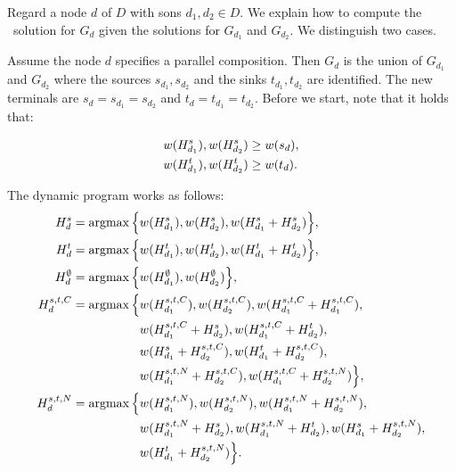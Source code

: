 Regard a node $d$ of $D$ with sons $d_1, d_2\in D$. We explain how to compute the \maxWSP\ solution for $G_d$ given the solutions for $G_{d_1}$ and $G_{d_2}$. We distinguish two cases.\medskip

Assume the node $d$ specifies a parallel composition. Then $G_d$ is the union of $G_{d_1}$ and $G_{d_2}$ where the sources $s_{d_1}, s_{d_2}$ and the sinks $t_{d_1}, t_{d_2}$ are identified. The new terminals are $s_d = s_{d_1} = s_{d_2}$ and $t_d = t_{d_1} = t_{d_2}$.
Before we start, note that it holds that:

\begin{align}
	\label{equ:spparallel}
	\begin{split}
		w(H_{d_1}^{s}), w(H_{d_2}^{s}) &\geq w(s_{d}),\\
		w(H_{d_1}^{t}), w(H_{d_2}^{t}) &\geq w(t_{d}).
	\end{split}
\end{align}

The dynamic program works as follows:
\begin{equation}
	\label{equ:parallelupdate}
	\begin{alignedat}{4}
		H_{d}^{s} &= \operatorname*{argmax} \Big\{ &&w(H_{d_1}^{s}), w(H_{d_2}^{s}), w(H_{d_1}^{s} + H_{d_2}^{s}) \Big\}, \\
		H_{d}^{t} &= \operatorname*{argmax} \Big\{ &&w(H_{d_1}^{t}), w(H_{d_2}^{t}), w(H_{d_1}^{t} + H_{d_2}^{t}) \Big\}, \\
		H_{d}^{\emptyset} &= \operatorname*{argmax} \Big\{ &&w(H_{d_1}^{\emptyset}), w(H_{d_2}^{\emptyset}) \Big\}, \\
		H_{d}^{s,t,C} &= \operatorname*{argmax} \Big\{ &&w(H_{d_1}^{s,t,C}), w(H_{d_2}^{s,t,C}), w(H_{d_1}^{s,t,C} + H_{d_1}^{s,t,C}), \\ 
		& &&w(H_{d_1}^{s,t,C} + H_{d_2}^{s}), w(H_{d_1}^{s,t,C} + H_{d_2}^{t}), \\
		& &&w(H_{d_1}^{s} + H_{d_2}^{s,t,C}), w(H_{d_1}^{t} + H_{d_2}^{s,t,C}), \\
		& &&w(H_{d_1}^{s,t,N} + H_{d_2}^{s,t,C}), w(H_{d_1}^{s,t,C} + H_{d_2}^{s,t,N}) \Big\}, \\		
		H_{d}^{s,t,N} &= \operatorname*{argmax} \Big\{ &&w(H_{d_1}^{s,t,N}), w(H_{d_2}^{s,t,N}), w(H_{d_1}^{s,t,N} + H_{d_2}^{s,t,N}), \\
		& &&w(H_{d_1}^{s,t,N} + H_{d_2}^{s}), w(H_{d_1}^{s,t,N} + H_{d_2}^{t}), w(H_{d_1}^{s} + H_{d_2}^{s,t,N}), \\
		& &&w(H_{d_1}^{t} + H_{d_2}^{s,t,N}) \Big\}.
	\end{alignedat}
\end{equation}

